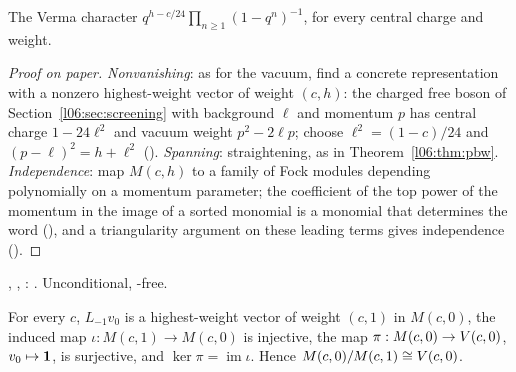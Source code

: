 \begin{physics}
The Verma character $q^{h-c/24}\prod_{n\ge1}(1-q^n)^{-1}$, for every central charge and weight.
\end{physics}

\begin{proof}[Proof on paper]
\emph{Nonvanishing}: as for the vacuum, find a concrete representation with a nonzero highest-weight vector
of weight $(c,h)$: the charged free boson of Section~\ref{l06:sec:screening} with background $\ell$ and
momentum $p$ has central charge $1-24\ell^2$ and vacuum weight $p^2-2\ell p$; choose $\ell^2 = (1-c)/24$
and $(p-\ell)^2 = h+\ell^2$ (\allowbreak{}\allowbreak{}). \emph{Spanning}: straightening, as in
Theorem~\ref{l06:thm:pbw}. \emph{Independence}: map $M(c,h)$ to a family of Fock modules depending
polynomially on a momentum parameter; the coefficient of the top power of the momentum in the image of a
sorted monomial is a monomial that determines the word (\allowbreak{}), and a triangularity
argument on these leading terms gives independence ().
\end{proof}

\begin{status}
\allowbreak{}\allowbreak{}\allowbreak{}\allowbreak{}\allowbreak{},
\allowbreak{}\allowbreak{}, :
\lean{[propext, Classical.}\allowbreak{}\allowbreak\lean{sound]}. Unconditional, -free.
\end{status}

\begin{theorem}\label{l06:thm:vacexact}
For every $c$, $L_{-1}v_0$ is a highest-weight vector of weight $(c,1)$ in $M(c,0)$, the induced map
$\iota:M(c,1)\to M(c,0)$ is injective, the map $\pi:M(c,0)\to V(c,0)$, $v_0\mapsto\mathbf{1}$, is surjective,
and $\ker\pi = \operatorname{im}\iota$. Hence $M(c,0)/M(c,1)\cong V(c,0)$.
\end{theorem}

